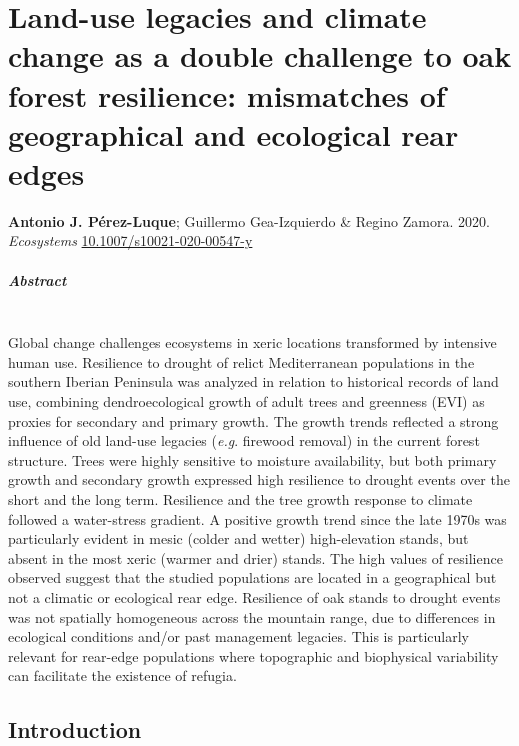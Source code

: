 %
\chapter{\textcolor{ctcolormain}{Land-use legacies and climate change as a double challenge to oak forest resilience: mismatches of geographical and ecological rear edges}}\label{sec:dendro}

\mbox{}
\vfill
{\color{ctcolormain}\textbf{Antonio J. Pérez-Luque}}; Guillermo Gea-Izquierdo \& Regino Zamora. 2020. \emph{Ecosystems}  \href{https://doi.org/10.1007/s10021-020-00547-y}{10.1007/s10021-020-00547-y}

\newpage

\paragraph{Abstract} \mbox{} \\
Global change challenges ecosystems in xeric locations transformed by intensive human use. Resilience to drought of relict Mediterranean \Qpy populations in the southern Iberian Peninsula was analyzed in relation to historical records of land use, combining dendroecological growth of adult trees and greenness (EVI) as proxies for secondary and primary growth. The growth trends reflected a strong influence of old land-use legacies (\emph{e.g}. firewood removal) in the current forest structure. Trees were highly sensitive to moisture availability, but both primary growth and secondary growth expressed high resilience to drought events over the short and the long term. Resilience and the tree growth response to climate followed a water-stress gradient. A positive growth trend since the late 1970s was particularly evident in mesic (colder and wetter) high-elevation stands, but absent in the most xeric (warmer and drier) stands. The high values of resilience observed suggest that the studied \Qp populations are located in a geographical but not a climatic or ecological rear edge. Resilience of oak stands to drought events was not spatially homogeneous across the mountain range, due to differences in ecological conditions and/or past management legacies. This is particularly relevant for rear-edge populations where topographic and biophysical variability can facilitate the existence of refugia.

\newpage

\section{Introduction}\label{sec:dendro:Intro}

